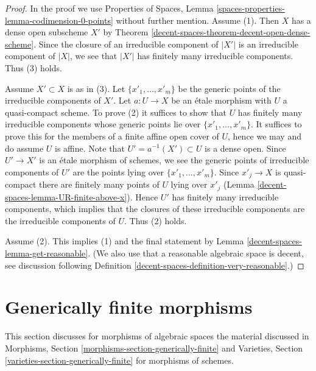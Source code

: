 \begin{proof}
In the proof we use Properties of Spaces, Lemma
\ref{spaces-properties-lemma-codimension-0-points}
without further mention.
Assume (1). Then $X$ has a dense open subscheme $X'$ by
Theorem \ref{decent-spaces-theorem-decent-open-dense-scheme}.
Since the closure of an irreducible component of $|X'|$
is an irreducible component of $|X|$, we see that $|X'|$
has finitely many irreducible components. Thus (3) holds.

\medskip\noindent
Assume $X' \subset X$ is as in (3). Let $\{x'_1, \ldots, x'_m\}$
be the generic points of the irreducible components of $X'$.
Let $a : U \to X$ be an \'etale morphism with $U$ a quasi-compact scheme.
To prove (2) it suffices to show that $U$ has
finitely many irreducible components
whose generic points lie over $\{x'_1, \ldots, x'_m\}$. It suffices
to prove this for the members of a finite affine open cover of $U$,
hence we may and do assume $U$ is affine.
Note that $U' = a^{-1}(X') \subset U$ is a dense open.
Since $U' \to X'$ is an \'etale morphism of schemes, we see
the generic points of irreducible components of $U'$ are the points
lying over $\{x'_1, \ldots, x'_m\}$. Since $x'_j \to X$ is
quasi-compact there are finitely many points of $U$ lying over $x'_j$
(Lemma \ref{decent-spaces-lemma-UR-finite-above-x}). Hence $U'$ has finitely
many irreducible components, which implies that the closures
of these irreducible components are the irreducible components of
$U$. Thus (2) holds.

\medskip\noindent
Assume (2). This implies (1) and the final
statement by Lemma \ref{decent-spaces-lemma-get-reasonable}.
(We also use that a reasonable algebraic space is decent, see
discussion following Definition \ref{decent-spaces-definition-very-reasonable}.)
\end{proof}

\section{Generically finite morphisms}
\label{decent-spaces-section-generically-finite}
This section discusses for morphisms of algebraic spaces the material
discussed in Morphisms, Section \ref{morphisms-section-generically-finite}
and
Varieties, Section \ref{varieties-section-generically-finite}
for morphisms of schemes.

